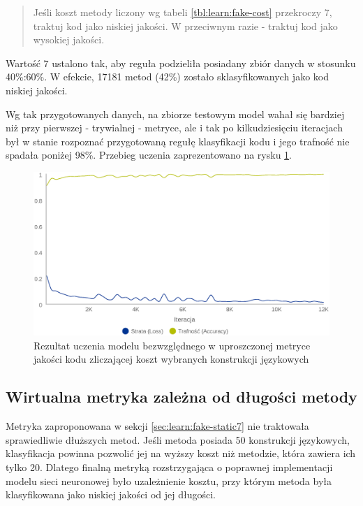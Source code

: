 \documentclass[12pt]{report}
\begin{document}
\begin{quotation}
\noindent Jeśli koszt metody liczony wg tabeli \ref{tbl:learn:fake-cost} przekroczy $7$, traktuj kod jako niskiej jakości. W przeciwnym razie - traktuj kod jako wysokiej jakości.
\end{quotation}

Wartość $7$ ustalono tak, aby reguła podzieliła posiadany zbiór danych w stosunku 40\%:60\%. W efekcie, 17181 metod (42\%) zostało sklasyfikowanych jako kod niskiej jakości.

Wg tak przygotowanych danych, na zbiorze testowym model wahał się bardziej niż przy pierwszej - trywialnej - metryce, ale i tak po kilkudziesięciu iteracjach był w stanie rozpoznać przygotowaną regułę klasyfikacji kodu i jego trafność nie spadała poniżej 98\%. Przebieg uczenia zaprezentowano na rysku \ref{fig:learn:fake-static7}.

\begin{figure}
\centering
\includegraphics[width=\textwidth]{learn/fake-static-7.eps}
\caption{Rezultat uczenia modelu bezwzględnego w uproszczonej metryce jakości kodu zliczającej koszt wybranych konstrukcji językowych}
\label{fig:learn:fake-static7}
\end{figure}

\subsection{Wirtualna metryka zależna od długości metody}
Metryka zaproponowana w sekcji \ref{sec:learn:fake-static7} nie traktowała sprawiedliwie dłuższych metod. Jeśli metoda posiada 50 konstrukcji językowych, klasyfikacja powinna pozwolić jej na wyższy koszt niż metodzie, która zawiera ich tylko 20. Dlatego finalną metryką rozstrzygająca o poprawnej implementacji modelu sieci neuronowej było uzależnienie kosztu, przy którym metoda była klasyfikowana jako niskiej jakości od jej długości.
\end{document}
